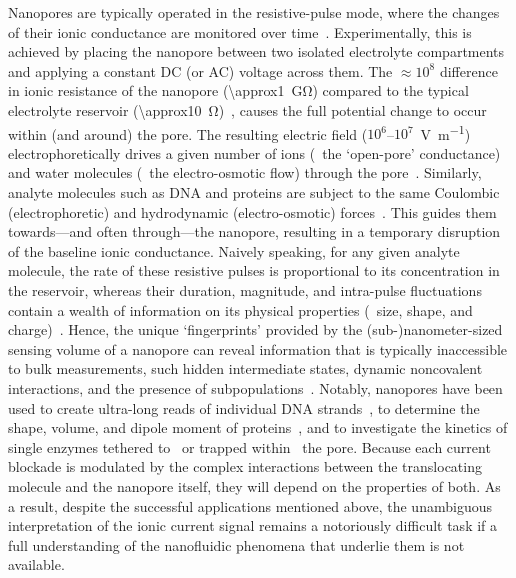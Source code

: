 Nanopores are typically operated in the resistive-pulse mode, where the changes of their ionic conductance are
monitored over time~\cite{Bayley-2001,Dekker-2007,Maglia-2010,Venkatesan-2011}. Experimentally, this is
achieved by placing the nanopore between two isolated electrolyte compartments and applying a constant DC (or
AC) voltage across them. The $\approx10^8$ difference in ionic resistance of the nanopore
(\SI{\approx1}{\giga\ohm}) compared to the typical electrolyte reservoir
(\SI{\approx10}{\ohm})~\cite{Maglia-2010}, causes the full potential change to occur within (and around) the
pore. The resulting electric field ($10^6$--$10^7$~\si{\V\per\m}) electrophoretically drives a given number of
ions (\ie~the `open-pore' conductance) and water molecules (\ie~the electro-osmotic flow) through the
pore~\cite{Wong-2007,Mao-2014,Haywood-2014,Laohakunakorn-2015}. Similarly, analyte molecules such as DNA and
proteins are subject to the same Coulombic (electrophoretic) and hydrodynamic (electro-osmotic)
forces~\cite{Wong-2007,Grosberg-2010,Muthukumar-2010,Muthukumar-2014}. This guides them towards---and often
through---the nanopore, resulting in a temporary disruption of the baseline ionic conductance. Naively
speaking, for any given analyte molecule, the rate of these resistive pulses is proportional to its
concentration in the reservoir, whereas their duration, magnitude, and intra-pulse fluctuations contain a
wealth of information on its physical properties (\eg~size, shape, and
charge)~\cite{Howorka-2009,Ying-2019,Lu-2020}. Hence, the unique `fingerprints' provided by the
(sub-)nanometer-sized sensing volume of a nanopore can reveal information that is typically inaccessible to
bulk measurements, such hidden intermediate states, dynamic noncovalent interactions, and the presence of
subpopulations~\cite{Ying-2019,Lu-2020}. Notably, nanopores have been used to create ultra-long reads of
individual DNA strands~\cite{Jain-2018}, to determine the shape, volume, and dipole moment of
proteins~\cite{Yusko-2017,Houghtaling-2019}, and to investigate the kinetics of single enzymes tethered
to~\cite{Derrington-2015,Harrington-2019} or trapped within~\cite{Li-2020,Galenkamp-2020} the pore. Because
each current blockade is modulated by the complex interactions between the translocating molecule and the
nanopore itself, they will depend on the properties of both. As a result, despite the successful applications
mentioned above, the unambiguous interpretation of the ionic current signal remains a notoriously difficult
task if a full understanding of the nanofluidic phenomena that underlie them is not available.

